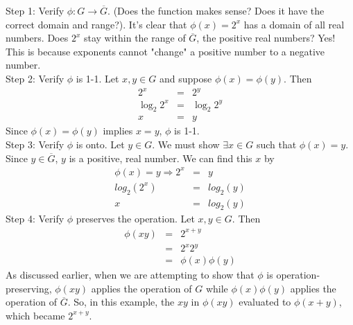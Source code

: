 \documentclass{article}
\begin{document}
Step 1: Verify $\phi \colon G \to \overline{G}$. (Does the function makes sense? Does it have
the correct domain and range?). It's clear that $\phi(x)=2^{x}$ has a domain of all real numbers.
Does $2^{x}$ stay within the range of $\overline{G}$, the positive real numbers? Yes! This is because
exponents cannot "change" a positive number to a negative number. \[\]
Step 2: Verify $\phi$ is 1-1. Let $x,y \in G$ and suppose $\phi(x)=\phi(y)$. Then
\begin{eqnarray*}
2^{x} &=& 2^{y} \\
\log_{2}2^{x} &=& \log_{2}2^{y} \\
x &=& y
\end{eqnarray*}
Since $\phi(x) = \phi(y)$ implies $x = y$, $\phi$ is 1-1. \[\]
Step 3: Verify $\phi$ is onto. Let $y \in G$. We must show $\exists x \in G$ such that $\phi(x) = y$. Since
$y \in \overline{G}$, $y$ is a positive, real number. We can find this $x$ by
\begin{eqnarray*}
\phi(x) =y \Rightarrow 2^{x} &=& y \\
log_{2}(2^{x}) &=& log_{2}(y) \\
x &=& log_{2}(y)
\end{eqnarray*} \[\]
Step 4: Verify $\phi$ preserves the operation. Let $x,y \in G$. Then
\begin{eqnarray}
\phi(xy) &=& 2^{x+y} \\
&=& 2^{x}2^{y} \\
&=& \phi(x)\phi(y)
\end{eqnarray}  
As discussed earlier, when we are attempting to show that $\phi$ is operation-preserving, $\phi(xy)$
applies the operation of $G$ while $\phi(x)\phi(y)$ applies the operation of $\overline{G}$. So, in
this example, the $xy$ in $\phi(xy)$ evaluated to $\phi(x+y)$, which became $2^{x+y}$.
\end{document}
